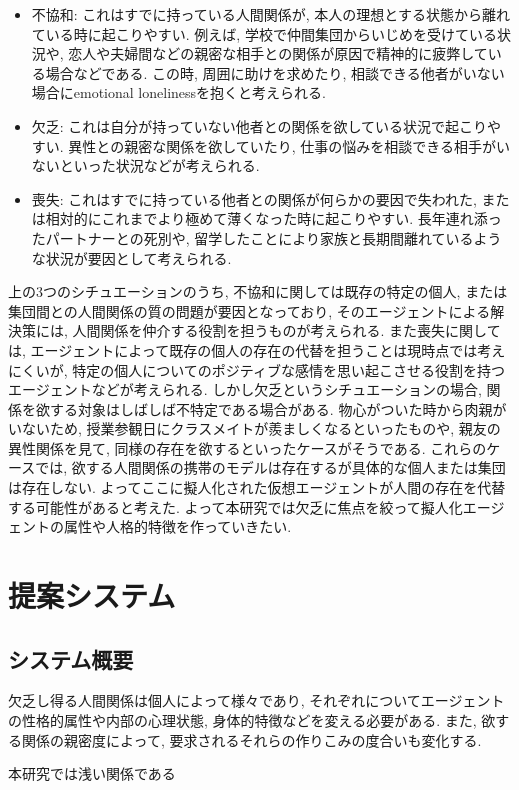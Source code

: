 \documentclass[a4paper,dvipdfmx]{hisken}
\begin{document}
\begin{itemize}
\item 不協和: これはすでに持っている人間関係が, 本人の理想とする状態から離れている時に起こりやすい. 例えば, 学校で仲間集団からいじめを受けている状況や, 恋人や夫婦間などの親密な相手との関係が原因で精神的に疲弊している場合などである. この時, 周囲に助けを求めたり, 相談できる他者がいない場合にemotional lonelinessを抱くと考えられる.
\item 欠乏: これは自分が持っていない他者との関係を欲している状況で起こりやすい. 異性との親密な関係を欲していたり, 仕事の悩みを相談できる相手がいないといった状況などが考えられる.
\item 喪失: これはすでに持っている他者との関係が何らかの要因で失われた, または相対的にこれまでより極めて薄くなった時に起こりやすい. 長年連れ添ったパートナーとの死別や, 留学したことにより家族と長期間離れているような状況が要因として考えられる.
\end{itemize}

上の3つのシチュエーションのうち, 不協和に関しては既存の特定の個人, または集団間との人間関係の質の問題が要因となっており, そのエージェントによる解決策には, 人間関係を仲介する役割を担うものが考えられる. また喪失に関しては, エージェントによって既存の個人の存在の代替を担うことは現時点では考えにくいが, 特定の個人についてのポジティブな感情を思い起こさせる役割を持つエージェントなどが考えられる. しかし欠乏というシチュエーションの場合, 関係を欲する対象はしばしば不特定である場合がある. 物心がついた時から肉親がいないため, 授業参観日にクラスメイトが羨ましくなるといったものや, 親友の異性関係を見て, 同様の存在を欲するといったケースがそうである. これらのケースでは, 欲する人間関係の携帯のモデルは存在するが具体的な個人または集団は存在しない. よってここに擬人化された仮想エージェントが人間の存在を代替する可能性があると考えた. よって本研究では欠乏に焦点を絞って擬人化エージェントの属性や人格的特徴を作っていきたい.


\section{提案システム}
\subsection{システム概要}
欠乏し得る人間関係は個人によって様々であり, それぞれについてエージェントの性格的属性や内部の心理状態, 身体的特徴などを変える必要がある. また, 欲する関係の親密度によって, 要求されるそれらの作りこみの度合いも変化する. 

本研究では浅い関係である
\end{document}
